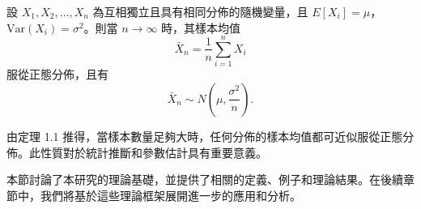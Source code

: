 \begin{theorem}
  設 \( X_1, X_2, \dots, X_n \) 為互相獨立且具有相同分佈的隨機變量，且 \( E[X_i] = \mu \)，\( \text{Var}(X_i) = \sigma^2 \)。則當 \( n \to \infty \) 時，其樣本均值
  \[
    \bar{X}_n = \frac{1}{n} \sum_{i=1}^n X_i
  \]
  服從正態分佈，且有
  \[
    \bar{X}_n \sim N\left(\mu, \frac{\sigma^2}{n}\right).
  \]
\end{theorem}

\begin{corollary}
  由定理 1.1 推得，當樣本數量足夠大時，任何分佈的樣本均值都可近似服從正態分佈。此性質對於統計推斷和參數估計具有重要意義。
\end{corollary}

本節討論了本研究的理論基礎，並提供了相關的定義、例子和理論結果。在後續章節中，我們將基於這些理論框架展開進一步的應用和分析。
